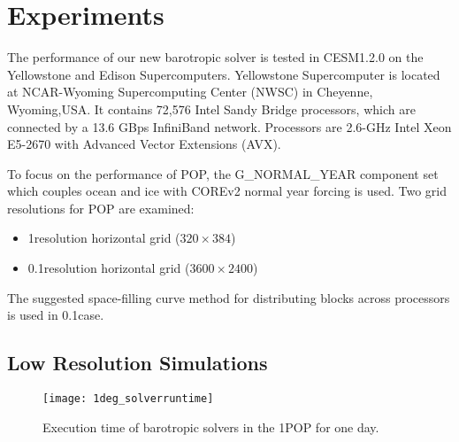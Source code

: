 \section{Experiments} \label{se:exp}

The performance of our new barotropic solver is tested in CESM1.2.0 on the Yellowstone and Edison Supercomputers. Yellowstone Supercomputer is located at NCAR-Wyoming Supercomputing Center (NWSC) in Cheyenne, Wyoming,USA. It contains 72,576 Intel Sandy Bridge processors, which are connected by a 13.6 GBps InfiniBand network. Processors are 2.6-GHz Intel Xeon E5-2670 with Advanced Vector Extensions (AVX). 

To focus on the performance of POP, the G\_NORMAL\_YEAR component set which couples ocean and ice with COREv2 normal year forcing is used.  
Two grid resolutions for POP are examined:
\begin{itemize} 
\item 1\degree resolution horizontal grid ($320\times 384$)
\item 0.1\degree resolution horizontal grid ($3600\times 2400$)
\end{itemize}
The suggested space-filling curve method for distributing blocks across processors is used in 0.1\degree case. 


\subsection{Low Resolution Simulations}
\begin {figure}[!t]
\centering
\texttt{[image: 1deg\_solverruntime]}
\caption []{Execution time of barotropic solvers in the 1\degree POP for one day.\label {fig:runtime1}}
\end {figure}

